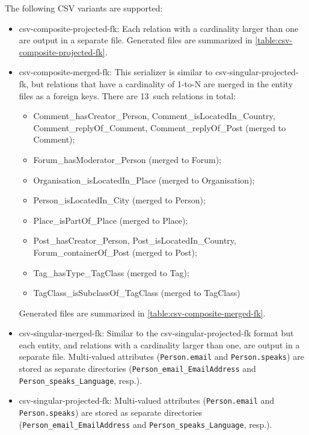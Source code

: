 The following CSV variants are supported:
    \begin{itemize}
      \item \textsf{csv-composite-projected-fk:}
      Each relation with a cardinality larger than one are output in a separate file.
      Generated files are summarized in \autoref{table:csv-composite-projected-fk}.

      \item \textsf{csv-composite-merged-fk:}
      This serializer is similar to \textsf{csv-singular-projected-fk}, but relations that have a cardinality of 1-to-N are merged in the entity files as a foreign keys.
      There are 13~such relations in total:
      \begin{itemize}
        \item Comment\_hasCreator\_Person, Comment\_isLocatedIn\_Country, Comment\_replyOf\_Comment, Comment\_replyOf\_Post (merged to Comment);
        \item Forum\_hasModerator\_Person (merged to Forum);
        \item Organisation\_isLocatedIn\_Place (merged to Organisation);
        \item Person\_isLocatedIn\_City (merged to Person);
        \item Place\_isPartOf\_Place (merged to Place);
        \item Post\_hasCreator\_Person, Post\_isLocatedIn\_Country, Forum\_containerOf\_Post (merged to Post);
        \item Tag\_hasType\_TagClass (merged to Tag);
        \item TagClass\_isSubclassOf\_TagClass (merged to TagClass)
      \end{itemize}
      Generated files are summarized in \autoref{table:csv-composite-merged-fk}.
    
      \item \textsf{csv-singular-merged-fk}:
      Similar to the \textsf{csv-singular-projected-fk} format but each entity, and relations with a cardinality larger than one, are output in a separate file.
      Multi-valued attributes (\texttt{Person.email} and \texttt{Person.speaks}) are stored as separate directories (\texttt{Person\_email\_EmailAddress} and \texttt{Person\_speaks\_Language}, resp.).
    
      \item \textsf{csv-singular-projected-fk}:
      Multi-valued attributes (\texttt{Person.email} and \texttt{Person.speaks}) are stored as separate directories (\texttt{Person\_email\_EmailAddress} and \texttt{Person\_speaks\_Language}, resp.).


\end{itemize}

